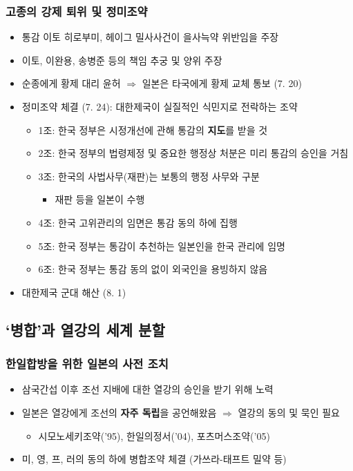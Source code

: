 \subsubsection*{고종의 강제 퇴위 및 정미조약}

\begin{itemize}
    \item 통감 이토 히로부미, 헤이그 밀사사건이 을사늑약 위반임을 주장
    \item 이토, 이완용, 송병준 등의 책임 추궁 및 양위 주장
    \item 순종에게 황제 대리 윤허 $\Rightarrow$ 일본은 타국에게 황제 교체 통보 (7. 20)
    \item 정미조약 체결 (7. 24): 대한제국이 실질적인 식민지로 전락하는 조약
    \begin{itemize}
        \item 1조: 한국 정부은 시정개선에 관해 통감의 \textbf{지도}를 받을 것
        \item 2조: 한국 정부의 법령제정 및 중요한 행정상 처분은 미리 통감의 승인을 거침
        \item 3조: 한국의 사법사무(재판)는 보통의 행정 사무와 구분
        \begin{itemize}
            \item 재판 등을 일본이 수행
        \end{itemize}
        \item 4조: 한국 고위관리의 임면은 통감 동의 하에 집행
        \item 5조: 한국 정부는 통감이 추천하는 일본인을 한국 관리에 임명
        \item 6조: 한국 정부는 통감 동의 없이 외국인을 용빙하지 않음
    \end{itemize}
    \item 대한제국 군대 해산 (8. 1)
\end{itemize}

\subsection{`병합'과 열강의 세계 분할}

\subsubsection*{한일합방을 위한 일본의 사전 조치}

\begin{itemize}
    \item 삼국간섭 이후 조선 지배에 대한 열강의 승인을 받기 위해 노력
    \item 일본은 열강에게 조선의 \textbf{자주 독립}을 공언해왔음 $\Rightarrow$ 열강의 동의 및 묵인 필요
    \begin{itemize}
        \item 시모노세키조약('95), 한일의정서('04), 포츠머스조약('05)
    \end{itemize}
    \item 미, 영, 프, 러의 동의 하에 병합조약 체결 (가쓰라-태프트 밀약 등)
\end{itemize}

